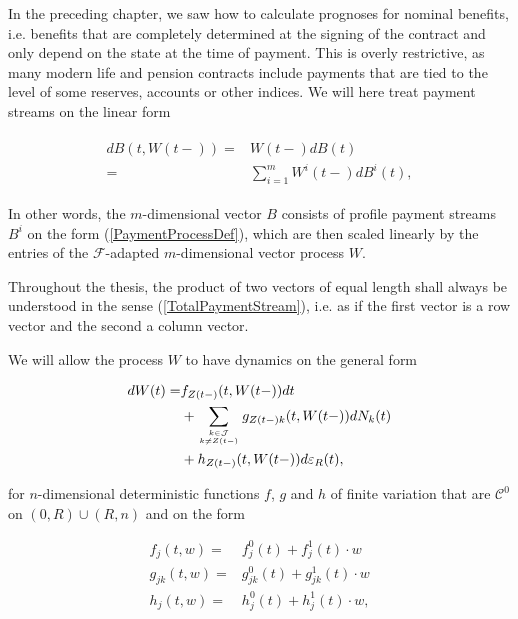 \documentclass{article}
\newcommand{\1}[1]{\mathbbm{1}_{\left\lbrace #1 \right\rbrace}}
\theoremstyle{break}
\theoremstyle{remark}
\newenvironment{remark}
  {\pushQED{\qed}\renewcommand{\qedsymbol}{\scalebox{1.4}{$\circ$}}\remarkx}
  {\popQED\endremarkx}
\numberwithin{equation}{section}
\begin{document}
In the preceding chapter, we saw how to calculate prognoses for nominal benefits, i.e. benefits that are completely determined at the signing of the contract and only depend on the state at the time of payment. This is overly restrictive, as many modern life and pension contracts include payments that are tied to the level of some reserves, accounts or other indices. We will here treat payment streams on the linear form

\begin{align} \label{TotalPaymentStream}
\begin{split}
	dB(t,W(t-)) =& W(t-) dB(t) \\
=& \sum_{i=1}^{m} W^i(t-) dB^i(t),
\end{split}
\end{align}

In other words, the $m$-dimensional vector $B$ consists of profile payment streams $B^i$ on the form (\ref{PaymentProcessDef}), which are then scaled linearly by the entries of the $\mathcal{F}$-adapted $m$-dimensional vector process $W$.

\begin{remark}
	Throughout the thesis, the product of two vectors of equal length shall always be understood in the sense (\ref{TotalPaymentStream}), i.e. as if the first vector is a row vector and the second a column vector.
\end{remark}

We will allow the process $W$ to have dynamics on the general form

\begin{align} \label{WDynamicsStart}
	\begin{split}
		dW(t) =& f_{Z(t-)}(t,W(t-)) dt \\
		&+ \sum_{k \in \mathcal{J} \atop k \neq Z(t-)} g_{Z(t-)k}(t,W(t-)) dN_{k}(t) \\
		&+ h_{Z(t-)}(t,W(t-)) d \varepsilon_R(t),
	\end{split}
\end{align}

for $n$-dimensional deterministic functions $f$, $g$ and $h$ of finite variation that are $\mathcal{C}^0$ on $(0,R) \cup (R,n)$ and on the form

\begin{align*}
	f_j(t,w) =& f_j^0(t) + f_j^1(t) \cdot w \\
	g_{jk}(t,w) =& g_{jk}^0(t) + g_{jk}^1(t) \cdot w \\
	h_j(t,w) =& h_j^0(t) + h_j^1(t) \cdot w,
\end{align*}
\end{document}
